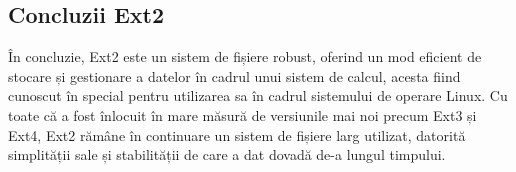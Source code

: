 \subsection{Concluzii Ext2}

În concluzie, Ext2 este un sistem de fișiere robust, oferind un mod eficient de stocare și gestionare a datelor în cadrul unui sistem de calcul, acesta fiind cunoscut în special pentru utilizarea sa în cadrul sistemului de operare Linux. Cu toate că a fost înlocuit în mare măsură de versiunile mai noi precum Ext3 și Ext4, Ext2 rămâne în continuare un sistem de fișiere larg utilizat, datorită simplității sale și stabilității de care a dat dovadă de-a lungul timpului.